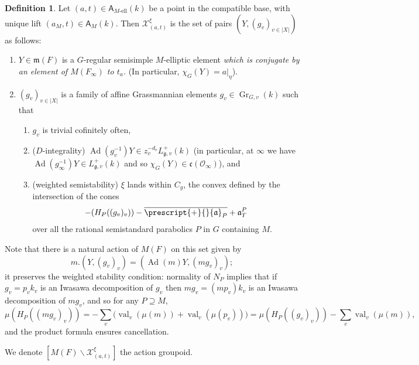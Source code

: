 \documentclass[openany]{amsbook}
\theoremstyle{definition}
\newtheorem{definition}[theorem]{Definition}
\theoremstyle{remark}
\numberwithin{equation}{section}
\renewcommand{\O}{\mathcal{O}}
\newcommand{\cX}{\mathcal{X}}
\newcommand{\ol}[1]{\overline{#1}}
\newcommand{\val}{\on{val}}
\renewcommand{\-}{\operatorname{-}}
\renewcommand{\a}{\mathfrak{a}}
\newcommand{\on}[1]{\operatorname{#1}}
\newcommand{\fm}{\mathfrak{m}}
\newcommand{\el}{\text{-ell}}
\newcommand{\bA}{\mathsf{A}}
\newcommand{\bAe}[1]{\bA_{#1\el}}
\newcommand{\fc}{\mathfrak{c}}
\renewcommand{\fm}{\mathfrak{m}}
\renewcommand{\fg}{\mathfrak{g}}
\newcommand{\obtcone}{\prescript{+}{}{\a}}
\newcommand{\Gr}{\on{Gr}}
\begin{document}
\begin{definition}
    Let $(a,t) \in \bAe{M}(k)$ be a point in the compatible base, with unique lift $(a_M, t) \in \bA_M(k)$. Then $\cX_{(a,t)}^\xi$ is the set of pairs $(Y, (g_v)_{v \in |X|})$ as follows:
    \begin{enumerate}
        \item $Y \in \fm(F)$ is a $G$-regular semisimple $M$-elliptic element \textit{which is conjugate by an element of $M(F_{\infty})$ to $t_a$.} (In particular, $\chi_G(Y) = a|_{\eta}$).
        \item $(g_v)_{v \in |X|}$ is a family of affine Grassmannian elements $g_v \in \Gr_{G,v}(k)$ such that 
        \begin{enumerate}
            \item $g_v$ is trivial cofinitely often,
            \item ($D$-integrality) $\on{Ad}(g_v^{-1})Y \in z_v^{-d_v} L^+_{\fg,v}(k)$ (in particular, at $\infty$ we have $\on{Ad}(g_{\infty}^{-1})Y \in L^+_{\fg,v}(k)$ and so $\chi_G(Y) \in \fc(\O_{\infty})$), and            
            \item (weighted semistability) $\xi$ lands within $C_g$, the convex defined by the intersection of the cones
            \[
                - (H_{P}((g_v)_v)) - \ol{\obtcone_P} + \a_T^P
            \]
            over all the rational semistandard parabolics $P$ in $G$ containing $M$. 
        \end{enumerate}
    \end{enumerate}

    Note that there is a natural action of $M(F)$ on this set given by
    \[
        m.(Y, (g_v)_v) = (\on{Ad}(m) Y, (mg_v)_v);
    \]
    it preserves the weighted stability condition: normality of $N_P$ implies that if $g_v = p_v k_v$ is an Iwasawa decomposition of $g_v$ then $m g_v = (m p_v) k_v$ is an Iwasawa decomposition of $m g_v$, and so for any $P \supseteq M$,
    \[
        \mu(H_P((mg_v)_{v})) = -\sum_v \Big(\val_v(\mu(m)) + \val_v(\mu(p_v))\Big) =\mu(H_P((g_v)_v)) - \sum_{v} \val_v(\mu(m)),
    \]
    and the product formula ensures cancellation. 
    
    We denote $[M(F) \backslash \cX_{(a,t)}^\xi]$ the action groupoid.
\end{definition}
\end{document}
